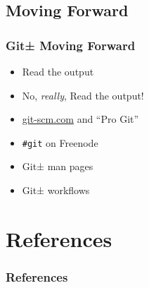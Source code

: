 \documentclass[]{beamer}
\begin{document}
\subsection{Moving Forward}
\begin{frame}
\frametitle{Git± Moving Forward}
\begin{itemize}
\item<2->{Read the output}
\item<3->{No, \textit{really}, Read the output!}
\item<4->{\url{git-scm.com} and ``Pro Git''}
\item<5->{\texttt{\#{}git} on Freenode}
\item<6->{Git± man pages~\cite{website:git_man_pages}
~\cite{website:understand_git_man_pages}}
\item<7->{Git± workflows~\cite{website:gitworkflows7}}
\end{itemize}
\end{frame}


\appendix

\section*{References}
\begin{frame}[allowframebreaks]
\frametitle{References}
\nocite{*}
\renewcommand{\refname}{}
\printbibliography{}
\end{frame}
\end{document}
